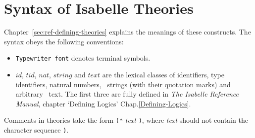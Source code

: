 
\appendix
{}  %

\chapter{Syntax of Isabelle Theories}\label{app:TheorySyntax}
Chapter~\ref{sec:ref-defining-theories} explains the meanings of these
constructs.  The syntax obeys the following conventions:
\begin{itemize}
\item {\tt Typewriter font} denotes terminal symbols.
\item $id$, $tid$, $nat$, $string$ and $text$ are the lexical classes of
  identifiers, type identifiers, natural numbers, \ML\ strings (with their
  quotation marks) and arbitrary \ML\ text.  The first three are fully defined
  in 
%
    {{\it The Isabelle Reference Manual}, chapter `Defining Logics'}%
    {Chap.\ts\ref{Defining-Logics}}.
\end{itemize}
Comments in theories take the form {\tt (*} {\it text\/} {\tt*)}, where
{\it text\/} should not contain the character sequence {\tt*)}.

